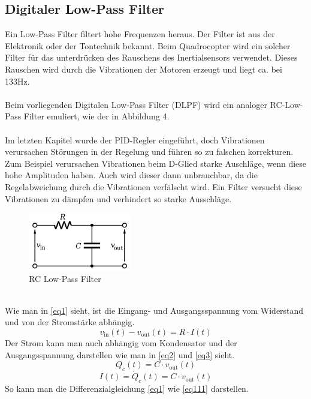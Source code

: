 \documentclass[12pt,a4paper, ngerman]{article}
\begin{document}
\subsection{Digitaler Low-Pass Filter}
Ein Low-Pass Filter filtert hohe Frequenzen heraus. Der Filter ist aus der Elektronik oder der Tontechnik bekannt. Beim Quadrocopter wird ein solcher Filter für das unterdrücken des Rauschens des Inertialsensors verwendet. Dieses Rauschen wird durch die Vibrationen der Motoren erzeugt und liegt ca. bei 133Hz.\\ \\
Beim vorliegenden Digitalen Low-Pass Filter (DLPF) wird ein analoger RC-Low-Pass Filter emuliert, wie der in Abbildung 4.\cite{website:Wikipedia_LPF}\\ \\
Im letzten Kapitel wurde der PID-Regler eingeführt, doch Vibrationen verursachen Störungen in der Regelung und führen so zu falschen korrekturen. Zum Beispiel verursachen Vibrationen beim D-Glied starke Auschläge, wenn diese hohe Amplituden haben. Auch wird dieser dann unbrauchbar, da die Regelabweichung durch die Vibrationen verfälscht wird. Ein Filter versucht diese Vibrationen zu dämpfen und verhindert so starke Ausschläge.
\begin{figure}[h]
\centering
\includegraphics[width=0.4\textwidth]{DLPF1.png}
\caption[aasdf]{RC Low-Pass Filter}
\end{figure}\\
Wie man in \ref{eq1} sieht, ist die Eingang- und Ausgangsspannung vom Widerstand und von der Stromstärke abhängig.
\begin{equation} \label{eq1}
v_{\text{in}}(t)-v_{\text{out}}(t)=R\cdot I(t)
\end{equation}
Der Strom kann man auch abhängig vom Kondensator und der Ausgangsspannung darstellen wie man in \ref{eq2} und \ref{eq3} sieht.
\begin{equation} \label{eq2}
Q_{c}(t)=C\cdot v_{\text{out}}(t)
\end{equation}
\begin{equation} \label{eq3}
I(t)=\dot{Q}_{c}(t)=C\cdot \dot{v}_{\text{out}}(t)
\end{equation}
So kann man die Differenzialgleichung \ref{eq1} wie \ref{eq111} darstellen.\\
\end{document}

